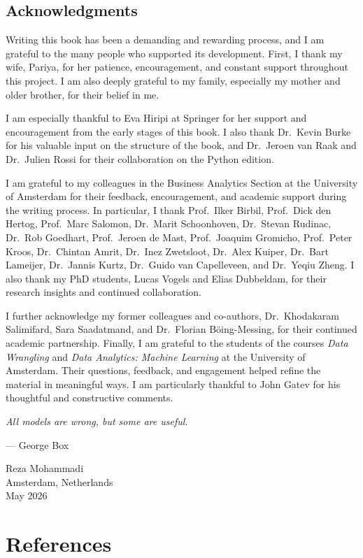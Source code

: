 \documentclass[
  letterpaper,
]{svmono}
\newlength{\cslhangindent}
\newenvironment{CSLReferences}[2] %
 {\begin{list}{}{%
  \setlength{\itemindent}{0pt}
  \setlength{\leftmargin}{0pt}
  \setlength{\parsep}{0pt}
  \ifodd #1
   \setlength{\leftmargin}{\cslhangindent}
   \setlength{\itemindent}{-1\cslhangindent}
  \fi
  \setlength{\itemsep}{#2\baselineskip}}}
 {\end{list}}
\numberwithin{example}{subsection}
\begin{document}
\section*{Acknowledgments}\label{acknowledgments}


Writing this book has been a demanding and rewarding process, and I am
grateful to the many people who supported its development. First, I
thank my wife, Pariya, for her patience, encouragement, and constant
support throughout this project. I am also deeply grateful to my family,
especially my mother and older brother, for their belief in me.

I am especially thankful to Eva Hiripi at Springer for her support and
encouragement from the early stages of this book. I also thank Dr.~Kevin
Burke for his valuable input on the structure of the book, and
Dr.~Jeroen van Raak and Dr.~Julien Rossi for their collaboration on the
Python edition.

I am grateful to my colleagues in the Business Analytics Section at the
University of Amsterdam for their feedback, encouragement, and academic
support during the writing process. In particular, I thank Prof.~Ilker
Birbil, Prof.~Dick den Hertog, Prof.~Marc Salomon, Dr.~Marit
Schoonhoven, Dr.~Stevan Rudinac, Dr.~Rob Goedhart, Prof.~Jeroen de Mast,
Prof.~Joaquim Gromicho, Prof.~Peter Kroos, Dr.~Chintan Amrit, Dr.~Inez
Zwetsloot, Dr.~Alex Kuiper, Dr.~Bart Lameijer, Dr.~Jannis Kurtz,
Dr.~Guido van Capelleveen, and Dr.~Yeqiu Zheng. I also thank my PhD
students, Lucas Vogels and Elias Dubbeldam, for their research insights
and continued collaboration.

I further acknowledge my former colleagues and co-authors,
Dr.~Khodakaram Salimifard, Sara Saadatmand, and Dr.~Florian
Böing-Messing, for their continued academic partnership. Finally, I am
grateful to the students of the courses \emph{Data Wrangling} and
\emph{Data Analytics: Machine Learning} at the University of Amsterdam.
Their questions, feedback, and engagement helped refine the material in
meaningful ways. I am particularly thankful to John Gatev for his
thoughtful and constructive comments.

\begin{center}
\textit{All models are wrong, but some are useful.}
\end{center}
\begin{flushright}
— George Box
\end{flushright}

Reza Mohammadi\\
Amsterdam, Netherlands\\
May 2026


\chapter*{References}\label{references}


\label{refs}
\begin{CSLReferences}{0}{1}
\end{CSLReferences}
\end{document}
